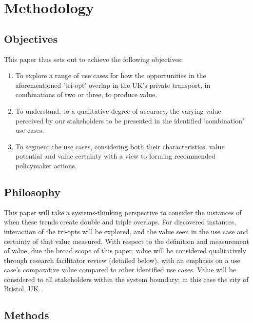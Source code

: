 \documentclass[journal]{IEEEtran}
\begin{document}
\section{Methodology}\label{methodology}

\subsection{Objectives}

This paper thus sets out to achieve the following objectives:

\begin{enumerate}
\item To explore a range of use cases for how the opportunities in the
  aforementioned 'tri-opt' overlap in the UK's private transport, in
  combinations of two or three, to produce value.  
\item To understand, to a qualitative degree of accuracy,
  the varying value perceived by our stakeholders to be presented in
  the identified 'combination' use cases. 
\item To segment the use cases, considering both their
  characteristics, value potential and value certainty with a view to forming
  recommended policymaker actions.
\end{enumerate}

\subsection{Philosophy}

This paper will take a systems-thinking perspective to consider the
instances of when these trends create double and triple overlaps. For
discovered instances, interaction of the tri-opts will be explored,
and the value seen in the use case and certainty of that value
measured. With respect to the definition and measurement of value, due
the broad scope of this paper, value will be considered qualitatively
through research facilitator review (detailed below), with an emphasis
on a use case's comparative value compared to other identified use
cases. Value will be considered to all stakeholders within the system
boundary; in this case the city of Bristol, UK.

\subsection{Methods}
\end{document}
